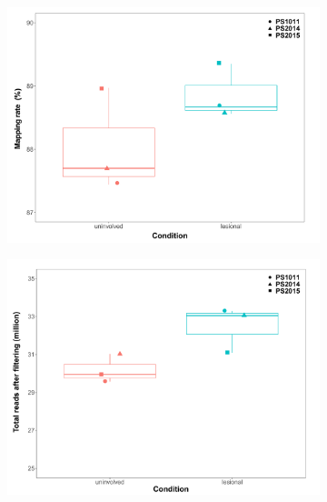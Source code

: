 \begin{figure}[htbp]
\centering
\begin{subfigure}{0.45\textwidth}
\centering
\includegraphics[width=\textwidth]{./Results2/pdfs/PS_lesional_uninvolved_RNAseq_uniquely_mapped_reads_percent_cell_type_and_batch_boxplots}
\caption{\textbf{}}
\end{subfigure}%
\begin{subfigure}{0.45\textwidth}
\centering
\includegraphics[width=\textwidth]{./Results2/pdfs/PS_lesional_uninvolved_RNAseq_total_reads_per_cell_type_and_batch}
\caption{\textbf{}}
\end{subfigure} \\

\end{figure}
